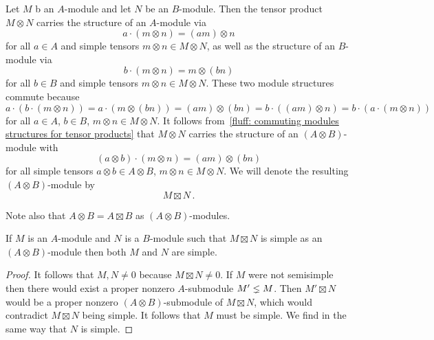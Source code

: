 \begin{fluff}
  Let $M$ b an $A$-module and let $N$ be an $B$-module.
  Then the tensor product $M \otimes N$ carries the structure of an $A$-module via
  \[
      a \cdot (m \otimes n)
    = (am) \otimes n
  \]
  for all $a \in A$ and simple tensors $m \otimes n \in M \otimes N$, as well as the structure of an $B$-module via
  \[
      b \cdot (m \otimes n)
    = m \otimes (bn)
  \]
  for all $b \in B$ and simple tensors $m \otimes n \in M \otimes N$.
  These two module structures commute because
  \[
      a \cdot (b \cdot (m \otimes n))
    = a \cdot (m \otimes (bn))
    = (am) \otimes (bn)
    = b \cdot ((am) \otimes n)
    = b \cdot (a \cdot (m \otimes n))
  \]
  for all $a \in A$, $b \in B$, $m \otimes n \in M \otimes N$.
  It follows from~\ref{fluff: commuting modules structures for tensor products} that $M \otimes N$ carries the structure of an $(A \otimes B)$-module with
  \[
      (a \otimes b) \cdot (m \otimes n)
    = (am) \otimes (bn)
  \]
  for all simple tensors $a \otimes b \in A \otimes B$, $m \otimes n \in M \otimes N$.
  We will denote the resulting $(A \otimes B)$-module by
  \[
    M \boxtimes N \,.
  \]
  
  
  Note also that $A \otimes B = A \boxtimes B$ as $(A \otimes B)$-modules.
\end{fluff}


\begin{lemma}
  \label{lemma: if product is simple then so are factors}
  If $M$ is an $A$-module and $N$ is a $B$-module such that $M \boxtimes N$ is simple as an $(A \otimes B)$-module then both $M$ and $N$ are simple.
\end{lemma}


\begin{proof}
  It follows that $M, N \neq 0$ because $M \boxtimes N \neq 0$.
  If $M$ were not semisimple then there would exist a proper nonzero $A$-submodule $M' \lneq M$.
  Then $M' \boxtimes N$ would be a proper nonzero $(A \otimes B)$-submodule of $M \boxtimes N$, which would contradict $M \boxtimes N$ being simple.
  It follows that $M$ must be simple.
  We find in the same way that $N$ is simple.
\end{proof}


